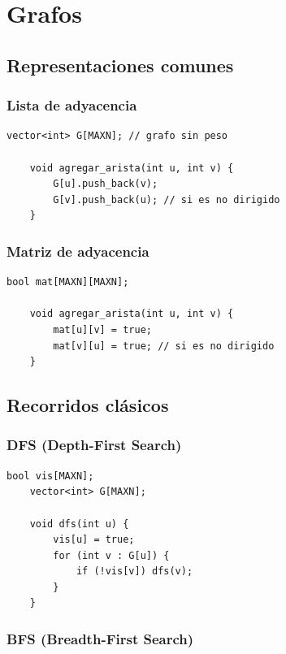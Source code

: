 \chapter{Grafos}


\section{Representaciones comunes}

\subsection*{Lista de adyacencia}

\begin{lstlisting}[caption=Lista de adyacencia]
	vector<int> G[MAXN]; // grafo sin peso
	
	void agregar_arista(int u, int v) {
		G[u].push_back(v);
		G[v].push_back(u); // si es no dirigido
	}
\end{lstlisting}

\subsection*{Matriz de adyacencia}

\begin{lstlisting}[caption=Matriz de adyacencia]
	bool mat[MAXN][MAXN];
	
	void agregar_arista(int u, int v) {
		mat[u][v] = true;
		mat[v][u] = true; // si es no dirigido
	}
\end{lstlisting}

\section{Recorridos clásicos}

\subsection{DFS (Depth-First Search)}

\begin{lstlisting}[caption=DFS no dirigido]
	bool vis[MAXN];
	vector<int> G[MAXN];
	
	void dfs(int u) {
		vis[u] = true;
		for (int v : G[u]) {
			if (!vis[v]) dfs(v);
		}
	}
\end{lstlisting}

\subsection{BFS (Breadth-First Search)}

